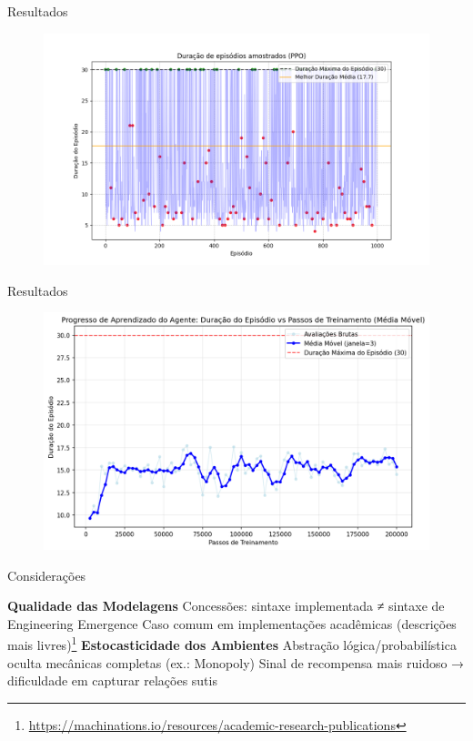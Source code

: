 \documentclass[aspectratio=169]{beamer}
\begin{document}
\begin{frame}{Resultados}
        \begin{figure}[htpb]
            \centering
            \includegraphics[width=0.85\linewidth]{figures/episode_lengths_ppo.png}
            \label{fig:ep_lens_ppo}
        \end{figure}
\end{frame}
\begin{frame}{Resultados}
        \begin{figure}[htpb]
            \centering
            \includegraphics[width=0.85\linewidth]{figures/eval_progress.png}
            \label{fig:eval_progress}
        \end{figure}
\end{frame}

\begin{frame}{Considerações}
  \begin{outline}
  \1 \textbf{Qualidade das Modelagens}
     \2 Concessões: sintaxe implementada ≠ sintaxe de Engineering Emergence
      \2 Caso comum em implementações acadêmicas (descrições mais livres)\footnote{\url{https://machinations.io/resources/academic-research-publications}}
  \1 \textbf{Estocasticidade dos Ambientes}
     \2 Abstração lógica/probabilística oculta mecânicas completas (ex.: Monopoly)
     \2 Sinal de recompensa mais ruidoso → dificuldade em capturar relações sutis
  \end{outline}
\end{frame}
\end{document}

